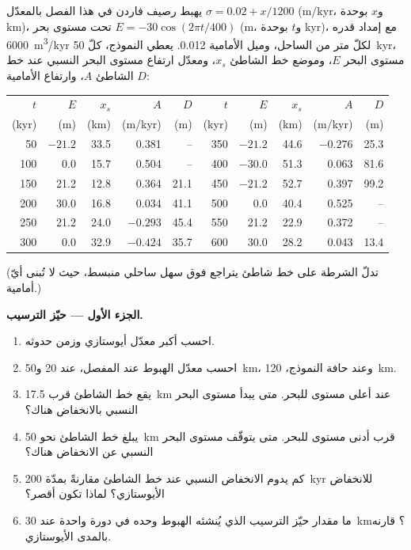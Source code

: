 \begin{problem}
\label{pb:b3:sequence-stratigraphy:1}
يهبط رصيف فاردن في هذا الفصل بالمعدّل $\sigma = 0.02 + x/1200$
(\unit{m/kyr}، و$x$ بوحدة km)، تحت مستوى بحر $E = -30\cos(2\pi t/400)$ (m،
و$t$ بوحدة \unit{kyr})، مع إمداد قدره \qty{6000}{m^3/kyr} لكلّ متر من الساحل، وميل الأمامية
0.012. يعطي النموذج، كلّ \qty{50}{kyr}، مستوى البحر
$E$، وموضع خط الشاطئ $x_s$، ومعدّل ارتفاع مستوى البحر النسبي عند
خط الشاطئ $A$، وارتفاع الأمامية $D$:

\begin{center}\small
\begin{tabular}{rrrrr|rrrrr}
$t$ & $E$ & $x_s$ & $A$ & $D$ & $t$ & $E$ & $x_s$ & $A$ & $D$\\
(kyr) & (m) & (km) & (m/kyr) & (m) & (kyr) & (m) & (km) & (m/kyr) & (m)\\\hline
50 & $-21.2$ & 33.5 & 0.381 & -- & 350 & $-21.2$ & 44.6 & $-0.276$ & 25.3\\
100 & 0.0 & 15.7 & 0.504 & -- & 400 & $-30.0$ & 51.3 & 0.063 & 81.6\\
150 & 21.2 & 12.8 & 0.364 & 21.1 & 450 & $-21.2$ & 52.7 & 0.397 & 99.2\\
200 & 30.0 & 16.8 & 0.034 & 41.1 & 500 & 0.0 & 40.4 & 0.525 & --\\
250 & 21.2 & 24.0 & $-0.293$ & 45.4 & 550 & 21.2 & 22.9 & 0.372 & --\\
300 & 0.0 & 32.9 & $-0.424$ & 35.7 & 600 & 30.0 & 28.2 & 0.043 & 13.4\\
\end{tabular}
\end{center}
(تدلّ الشرطة على خط شاطئ يتراجع فوق سهل ساحلي منبسط، حيث
لا تُبنى أيّ أمامية.)

\medskip\noindent\textbf{الجزء الأول --- حيّز الترسيب.}
\begin{enumerate}
\item احسب أكبر معدّل أيوستازي وزمن حدوثه.
\item احسب معدّل الهبوط عند المفصل، عند 20 و\qty{50}{km}،
  وعند حافة النموذج، \qty{120}{km}.
\item يقع خط الشاطئ قرب \qty{17.5}{km} عند أعلى مستوى للبحر. متى يبدأ
  مستوى البحر النسبي بالانخفاض هناك؟
\item يبلغ خط الشاطئ نحو \qty{50}{km} قرب أدنى مستوى للبحر. متى يتوقّف
  مستوى البحر النسبي عن الانخفاض هناك؟
\item كم يدوم الانخفاض النسبي عند خط الشاطئ مقارنةً بمدّة
  \qty{200}{kyr} للانخفاض الأيوستازي؟ لماذا تكون أقصر؟
\item ما مقدار حيّز الترسيب الذي يُنشئه الهبوط وحده في دورة واحدة عند
  \qty{30}{km}؟ قارنه بالمدى الأيوستازي.
\end{enumerate}


\end{problem}

